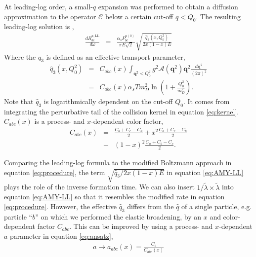 \documentclass[aps, prc, reprint, amsmath, groupedaddress, nofootinbib]{revtex4-1}
\begin{document}
At leading-log order, a small-$q$ expansion was performed to obtain a diffusion approximation to the operator $\mathcal{C}$ below a certain cut-off $q<Q_0$.
The resulting leading-log solution is \cite{Arnold:2008zu},
\begin{eqnarray}\label{eq:AMY-LL}
\frac{dR_{bc}^{a,\textrm{LL}}}{d\omega} &=& \frac{\alpha_s P_{bc}^{a(0)}}{\pi E\sqrt{2}}
\sqrt{\frac{\hat{q}_3(x, Q_0^2)}{2x(1-x)E}}
\end{eqnarray}
Where the $\hat{q}_3$ is defined as an effective transport parameter,
\begin{eqnarray}
\hat{q}_3(x, Q_0^2) &=& C_{abc}(x) \int_{\mathbf{q}^2 < Q_0^2} g^2\mathcal{A}(\mathbf{q}^2) \mathbf{q}^2 \frac{d\mathbf{q}^2}{(2\pi)^2} \\
&=& C_{abc}(x) \alpha_s T m_D^2 \ln\left(1+\frac{Q_0^2}{m_D^2}\right).\label{eq:qhat3}
\end{eqnarray}
Note that $\hat{q}_3$ is logarithmically dependent on the cut-off $Q_0$.
It comes from integrating the perturbative tail of the collision kernel in equation \ref{eq:kernel}.
$C_{abc}(x)$ is a process- and $x$-dependent color factor,
\begin{eqnarray}
C_{abc}(x) &=&  \frac{C_b+C_c-C_a}{2} + x^2 \frac{C_a+C_c-C_b}{2} \\\nonumber
&+& (1-x)^2\frac{C_a+C_b-C_c}{2}.
\end{eqnarray}

Comparing the leading-log formula to the modified Boltzmann approach in equation \ref{eq:procedure}, the term $\sqrt{\hat{q}_3 / 2x(1-x)E}$ in equation \ref{eq:AMY-LL} plays the role of the inverse formation time.
We can also insert $1/\tilde{\lambda} \times \tilde{\lambda}$ into equation \ref{eq:AMY-LL} so that it resembles the modified rate in equation \ref{eq:procedure}.
However, the effective $\hat{q}_3$ differs from the $\hat{q}$ of a single particle, e.g. particle ``$b$'' on which we performed the elastic broadening, by an $x$ and color-dependent factor $C_{abc}$.
This can be improved by using a process- and $x$-dependent $a$ parameter in equation \ref{eq:ansatz},
\begin{eqnarray}
a \rightarrow a_{abc}(x) = \frac{C_b}{C_{abc}(x)}
\end{eqnarray}
\end{document}

